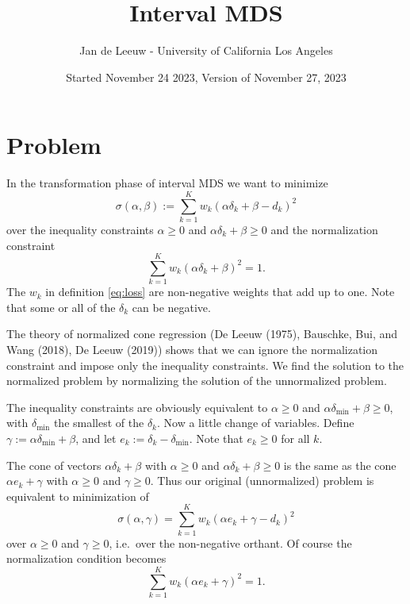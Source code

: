 \documentclass[
  12pt,
]{article}
\title{Interval MDS}
\author{Jan de Leeuw - University of California Los Angeles}
\date{Started November 24 2023, Version of November 27, 2023}
\begin{document}
\maketitle

{
\setcounter{tocdepth}{2}
\tableofcontents
}
\section{Problem}\label{problem}

In the transformation phase of interval MDS we want to minimize
\begin{equation}
\sigma(\alpha,\beta):=\sum_{k=1}^Kw_k(\alpha\delta_k+\beta-d_k)^2
\label{eq:loss}
\end{equation}
over the inequality constraints \(\alpha\geq 0\) and
\(\alpha\delta_k+\beta\geq 0\) and the normalization constraint
\begin{equation}
\sum_{k=1}^Kw_k(\alpha\delta_k+\beta)^2=1.
\end{equation}
The \(w_k\) in definition \eqref{eq:loss} are non-negative weights that
add up to one. Note that some or all of the \(\delta_k\) can be negative.

The theory of normalized cone regression (De Leeuw (1975),
Bauschke, Bui, and Wang (2018), De Leeuw (2019)) shows that we can ignore the
normalization constraint and impose only the inequality constraints. We
find the solution to the normalized problem by normalizing the solution
of the unnormalized problem.

The inequality constraints are obviously equivalent to \(\alpha\geq 0\)
and \(\alpha\delta_{\text{min}}+\beta\geq 0\), with \(\delta_{\text{min}}\)
the smallest of the \(\delta_k\). Now a little change of variables.
Define
\(\gamma:=\alpha\delta_{\text{min}}+\beta\), and let
\(e_k:=\delta_k-\delta_{\text{min}}\). Note that
\(e_k\geq 0\) for all \(k\).

The cone of vectors \(\alpha\delta_k+\beta\) with \(\alpha\geq 0\) and
\(\alpha\delta_k+\beta\geq 0\) is the same as the cone \(\alpha e_k+\gamma\)
with \(\alpha\geq 0\) and \(\gamma\geq 0\). Thus our original (unnormalized)
problem is equivalent to minimization of
\begin{equation}
\sigma(\alpha,\gamma)=\sum_{k=1}^Kw_k(\alpha e_k+\gamma-d_k)^2
\end{equation}
over \(\alpha\geq 0\) and \(\gamma\geq 0\), i.e.~over the non-negative
orthant. Of course the normalization condition becomes
\begin{equation}
\sum_{k=1}^Kw_k(\alpha e_k+\gamma)^2=1.
\end{equation}
\end{document}
